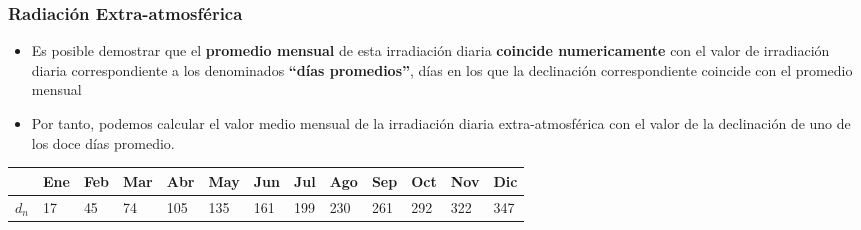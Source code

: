 \documentclass[serif, xcolor=dvipsnames]{beamer}
\begin{document}
\begin{frame}
\frametitle{Radiación Extra-atmosférica}
\begin{itemize}
\item Es posible demostrar que el \textbf{promedio mensual} de esta irradiación
diaria \textbf{coincide numericamente} con el valor de irradiación
diaria correspondiente a los denominados \textbf{{}``días promedios''},
días en los que la declinación correspondiente coincide con el promedio
mensual 
\item Por tanto, podemos calcular el valor medio mensual de la irradiación
diaria extra-atmosférica con el valor de la declinación de uno de
los doce días promedio.
\end{itemize}
\begin{center}
{\footnotesize }\begin{tabular}{>{\centering}p{6mm}>{\centering}m{4mm}>{\centering}m{4mm}>{\centering}m{4mm}>{\centering}m{4mm}>{\centering}m{4mm}>{\centering}m{4mm}>{\centering}m{4mm}>{\centering}m{4mm}>{\centering}m{4mm}>{\centering}m{4mm}>{\centering}m{4mm}>{\centering}m{3mm}}
\toprule 
{\footnotesize Mes} & {\footnotesize Ene} & {\footnotesize Feb} & {\footnotesize Mar} & {\footnotesize Abr} & {\footnotesize May} & {\footnotesize Jun} & {\footnotesize Jul} & {\footnotesize Ago} & {\footnotesize Sep} & {\footnotesize Oct} & {\footnotesize Nov} & {\footnotesize Dic}\tabularnewline
\midrule
$d_{n}$ & {\footnotesize 17} & {\footnotesize 45} & {\footnotesize 74} & {\footnotesize 105} & {\footnotesize 135} & {\footnotesize 161} & {\footnotesize 199} & {\footnotesize 230} & {\footnotesize 261} & {\footnotesize 292} & {\footnotesize 322} & {\footnotesize 347}\tabularnewline
\bottomrule
\end{tabular}
\par\end{center}{\footnotesize \par}


\end{frame}
\end{document}
